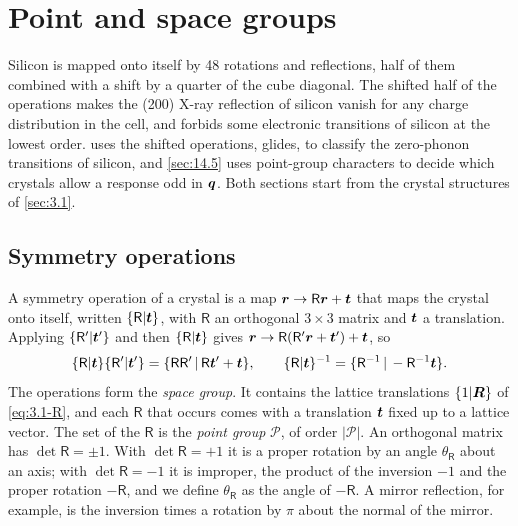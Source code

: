 \section{Point and space groups}\label{app:C.17}

Silicon is mapped onto itself by 48 rotations and reflections, half of them combined with a shift by a quarter of the cube diagonal. The shifted half of the operations makes the (200) X-ray reflection of silicon vanish for any charge distribution in the cell, and forbids some electronic transitions of silicon at the lowest order.  uses the shifted operations, glides, to classify the zero-phonon transitions of silicon, and \cref{sec:14.5} uses point-group characters to decide which crystals allow a response odd in $\bm{q}$. Both sections start from the crystal structures of \cref{sec:3.1}.

\subsection{Symmetry operations}

A symmetry operation of a crystal is a map $\bm{r} \to \mathsf{R}\bm{r} + \bm{t}$ that maps the crystal onto itself, written $\{\mathsf{R}|\bm{t}\}$, with $\mathsf{R}$ an orthogonal $3\times3$ matrix and $\bm{t}$ a translation. Applying $\{\mathsf{R}'|\bm{t}'\}$ and then $\{\mathsf{R}|\bm{t}\}$ gives $\bm{r} \to \mathsf{R}(\mathsf{R}'\bm{r} + \bm{t}') + \bm{t}$, so
\begin{equation}
  \{\mathsf{R}|\bm{t}\}\{\mathsf{R}'|\bm{t}'\} = \{\mathsf{R}\mathsf{R}'\,|\,\mathsf{R}\bm{t}' + \bm{t}\}, \qquad
  \{\mathsf{R}|\bm{t}\}^{-1} = \{\mathsf{R}^{-1}\,|\,-\mathsf{R}^{-1}\bm{t}\} .
  \label{eq:C.17-compose}
\end{equation}
The operations form the \emph{space group}. It contains the lattice translations $\{1|\bm{R}\}$ of \cref{eq:3.1-R}, and each $\mathsf{R}$ that occurs comes with a translation $\bm{t}$ fixed up to a lattice vector. The set of the $\mathsf{R}$ is the \emph{point group} $\mathcal{P}$, of order $|\mathcal{P}|$. An orthogonal matrix has $\det\mathsf{R} = \pm1$. With $\det\mathsf{R} = +1$ it is a proper rotation by an angle $\theta_{\mathsf{R}}$ about an axis; with $\det\mathsf{R} = -1$ it is improper, the product of the inversion $-1$ and the proper rotation $-\mathsf{R}$, and we define $\theta_{\mathsf{R}}$ as the angle of $-\mathsf{R}$. A mirror reflection, for example, is the inversion times a rotation by $\pi$ about the normal of the mirror.

